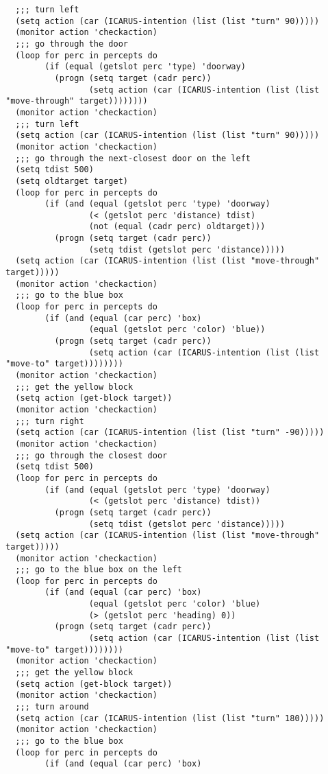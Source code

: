 \documentclass{article}
\begin{document}
\begin{verbatim}
  ;;; turn left
  (setq action (car (ICARUS-intention (list (list "turn" 90)))))
  (monitor action 'checkaction)
  ;;; go through the door
  (loop for perc in percepts do
        (if (equal (getslot perc 'type) 'doorway)
          (progn (setq target (cadr perc))
                 (setq action (car (ICARUS-intention (list (list "move-through" target))))))))
  (monitor action 'checkaction)
  ;;; turn left
  (setq action (car (ICARUS-intention (list (list "turn" 90)))))
  (monitor action 'checkaction)
  ;;; go through the next-closest door on the left
  (setq tdist 500)
  (setq oldtarget target)
  (loop for perc in percepts do
        (if (and (equal (getslot perc 'type) 'doorway)
                 (< (getslot perc 'distance) tdist)
                 (not (equal (cadr perc) oldtarget)))
          (progn (setq target (cadr perc))
                 (setq tdist (getslot perc 'distance)))))
  (setq action (car (ICARUS-intention (list (list "move-through" target)))))
  (monitor action 'checkaction)
  ;;; go to the blue box
  (loop for perc in percepts do
        (if (and (equal (car perc) 'box)
                 (equal (getslot perc 'color) 'blue))
          (progn (setq target (cadr perc))
                 (setq action (car (ICARUS-intention (list (list "move-to" target))))))))
  (monitor action 'checkaction)
  ;;; get the yellow block
  (setq action (get-block target))
  (monitor action 'checkaction)
  ;;; turn right
  (setq action (car (ICARUS-intention (list (list "turn" -90)))))
  (monitor action 'checkaction)
  ;;; go through the closest door
  (setq tdist 500)
  (loop for perc in percepts do
        (if (and (equal (getslot perc 'type) 'doorway)
                 (< (getslot perc 'distance) tdist))
          (progn (setq target (cadr perc))
                 (setq tdist (getslot perc 'distance)))))
  (setq action (car (ICARUS-intention (list (list "move-through" target)))))
  (monitor action 'checkaction)
  ;;; go to the blue box on the left
  (loop for perc in percepts do
        (if (and (equal (car perc) 'box)
                 (equal (getslot perc 'color) 'blue)
                 (> (getslot perc 'heading) 0))
          (progn (setq target (cadr perc))
                 (setq action (car (ICARUS-intention (list (list "move-to" target))))))))
  (monitor action 'checkaction)
  ;;; get the yellow block
  (setq action (get-block target))
  (monitor action 'checkaction)
  ;;; turn around
  (setq action (car (ICARUS-intention (list (list "turn" 180)))))
  (monitor action 'checkaction)
  ;;; go to the blue box
  (loop for perc in percepts do
        (if (and (equal (car perc) 'box)

\end{verbatim}
\end{document}
